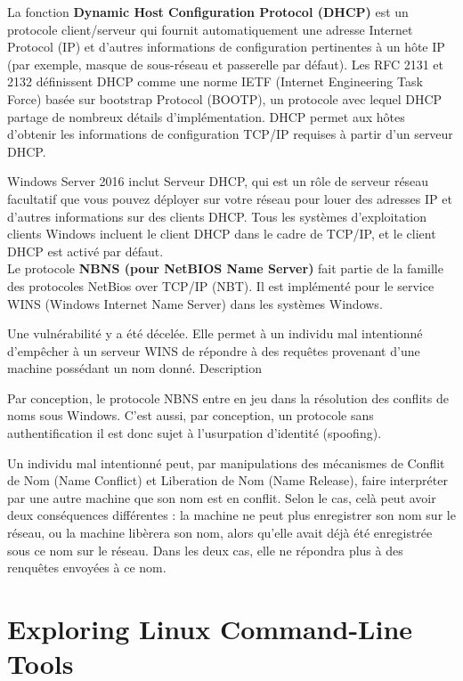 \documentclass[a4paper]{article}
\begin{document}
	La fonction \textbf{Dynamic Host Configuration Protocol (DHCP)} est un protocole client/serveur qui fournit automatiquement une adresse Internet Protocol (IP) et d’autres informations de configuration pertinentes à un hôte IP (par exemple, masque de sous-réseau et passerelle par défaut). Les RFC 2131 et 2132 définissent DHCP comme une norme IETF (Internet Engineering Task Force) basée sur bootstrap Protocol (BOOTP), un protocole avec lequel DHCP partage de nombreux détails d’implémentation. DHCP permet aux hôtes d’obtenir les informations de configuration TCP/IP requises à partir d’un serveur DHCP.

	Windows Server 2016 inclut Serveur DHCP, qui est un rôle de serveur réseau facultatif que vous pouvez déployer sur votre réseau pour louer des adresses IP et d’autres informations sur des clients DHCP. Tous les systèmes d’exploitation clients Windows incluent le client DHCP dans le cadre de TCP/IP, et le client DHCP est activé par défaut. \\

	Le protocole \textbf{NBNS (pour NetBIOS Name Server)} fait partie de la famille des protocoles NetBios over TCP/IP (NBT). Il est implémenté pour le service WINS (Windows Internet Name Server) dans les systèmes Windows.

	Une vulnérabilité y a été décelée. Elle permet à un individu mal intentionné d'empêcher à un serveur WINS de répondre à des requêtes provenant d'une machine possédant un nom donné.
	Description

	Par conception, le protocole NBNS entre en jeu dans la résolution des conflits de noms sous Windows. C'est aussi, par conception, un protocole sans authentification il est donc sujet à l'usurpation d'identité (spoofing).

	Un individu mal intentionné peut, par manipulations des mécanismes de Conflit de Nom (Name Conflict) et Liberation de Nom (Name Release), faire interpréter par une autre machine que son nom est en conflit. Selon le cas, celà peut avoir deux conséquences différentes : la machine ne peut plus enregistrer son nom sur le réseau, ou la machine libèrera son nom, alors qu'elle avait déjà été enregistrée sous ce nom sur le réseau. Dans les deux cas, elle ne répondra plus à des renquêtes envoyées à ce nom. \\


\section{Exploring Linux Command-Line Tools}
\end{document}
